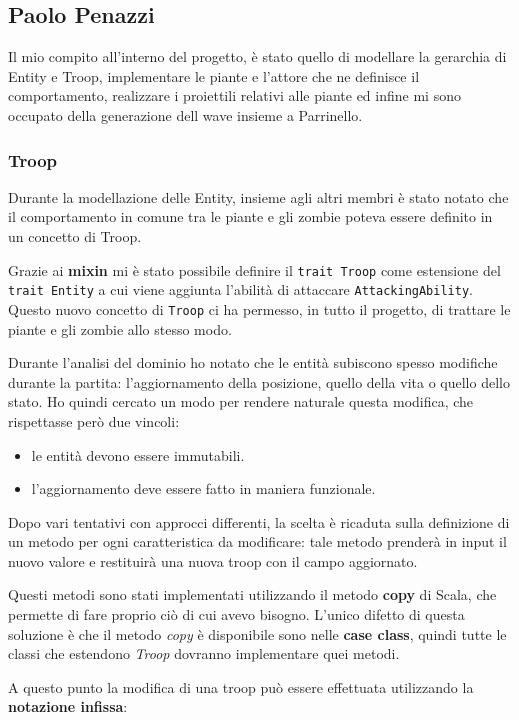 \subsection{Paolo Penazzi}
Il mio compito all’interno del progetto, è stato quello di modellare la gerarchia di Entity e Troop,
implementare le piante e l'attore che ne definisce il comportamento, realizzare i proiettili relativi alle piante ed
infine mi sono occupato della generazione dell wave insieme a Parrinello.

\subsubsection{Troop}
Durante la modellazione delle Entity, insieme agli altri membri è stato notato che il comportamento in comune tra le piante e gli zombie poteva essere definito in un concetto di Troop.

Grazie ai \textbf{mixin} mi è stato possibile definire il \texttt{trait Troop} come estensione del \texttt{trait Entity}
a cui viene aggiunta l'abilità di attaccare \texttt{AttackingAbility}.
Questo nuovo concetto di \texttt{Troop} ci ha permesso, in tutto il progetto, di trattare le piante e gli zombie allo stesso modo.

Durante l'analisi del dominio ho notato che le entità subiscono spesso modifiche durante la partita: l'aggiornamento della posizione, quello della vita o quello dello stato.
Ho quindi cercato un modo per rendere naturale questa modifica, che rispettasse però due vincoli:
\begin{itemize}
    \item le entità devono essere immutabili.
    \item l'aggiornamento deve essere fatto in maniera funzionale.
\end{itemize}
Dopo vari tentativi con approcci differenti, la scelta è ricaduta sulla definizione di un metodo per ogni caratteristica da modificare: tale metodo prenderà in input il nuovo valore e restituirà una nuova troop con il campo aggiornato.

Questi metodi sono stati implementati utilizzando il metodo \textbf{copy} di Scala, che permette di fare proprio ciò di cui avevo bisogno.
L'unico difetto di questa soluzione è che il metodo \textit{copy} è disponibile sono nelle \textbf{case class}, quindi tutte le classi che estendono \textit{Troop} dovranno implementare quei metodi.

A questo punto la modifica di una troop può essere effettuata utilizzando la \textbf{notazione infissa}:

